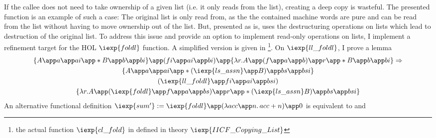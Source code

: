 If the callee does not need to take ownership of a given list (i.e. it only reads from the list), creating a deep copy is wasteful.
The presented  function is an example of such a case: The original list is only read from, as the the contained machine words are pure and can be read from the list without having to move ownership out of the list.
But, presented as is,  uses the destructuring operations on lists which lead to destruction of the original list.
To address this issue and provide an option to implement read-only operations on lists, I implement a refinement target for the HOL $\iexp{foldl}$ function.
A simplified version is given in  \footnote{the actual function $\iexp{cl\_fold}$ in defined in theory $\iexp{IICF\_Copying\_List}$}.
On $\iexp{ll\_foldl}$, I prove a lemma
\begin{gather*}
  \{A \app a \app ai \app \ast B \app b \app bi\} \app
  (fi \app ai \app bi) \app
  \{\lambda r. A \app (f \app a \app b) \app r \app \ast B \app b \app bi\} \Rightarrow \\
  \{A \app a \app ai \app \ast (\iexp{ls\_assn} \app B) \app bs \app bsi\} \\
  (\iexp{ll\_foldl} \app fi \app ai \app bsi)\\
  \{\lambda r. A \app (\iexp{foldl} \app f \app a \app bs) \app r \app \ast (\iexp{ls\_assn} B) \app bs \app bsi\}
\end{gather*}
An alternative functional definition $\iexp{sum'} := \iexp{foldl} \app (\lambda acc \app n.\, acc + n) \app 0$ is equivalent to  and 

